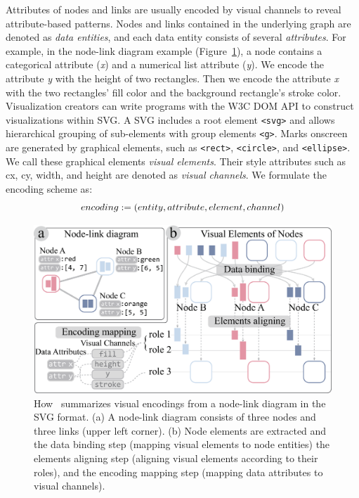 Attributes of nodes and links are usually encoded by visual channels to reveal attribute-based patterns.
Nodes and links contained in the underlying graph are denoted as \textit{data entities}, and each data entity consists of several \textit{attributes}.
For example, in the node-link diagram example (Figure~\ref{fig:VisualEncodings}), a node contains a categorical attribute (\textit{x}) and a numerical list attribute (\textit{y}). We encode the attribute \textit{y} with the height of two rectangles.
Then we encode the attribute \textit{x} with the two rectangles' fill color and the background rectangle's stroke color.
Visualization creators can write programs with the W3C DOM API to construct visualizations within SVG.
A SVG includes a root element \texttt{<svg>} and allows hierarchical grouping of sub-elements with group elements \texttt{<g>}.
Marks onscreen are generated by graphical elements, such as \texttt{<rect>}, \texttt{<circle>}, and \texttt{<ellipse>}.
We call these graphical elements \textit{visual elements}.
Their style attributes such as cx, cy, width, and height are denoted as \textit{visual channels}. We formulate the encoding scheme as:
\begin{equation}
    \abovedisplayskip=5pt
    \abovedisplayshortskip=5pt
    \belowdisplayskip=5pt
    \belowdisplayshortskip=5pt
    encoding := (entity, attribute, element, channel) \label{def:encoding}
\end{equation}


\begin{figure}[tp]
    \centering
    \includegraphics[width=1\columnwidth]{figures/VisualEncodings.eps}
    \setlength{\belowcaptionskip}{-10pt}
    \caption{How \ApproachName~summarizes visual encodings from a node-link diagram in the SVG format. (a) A node-link diagram consists of three nodes and three links (upper left corner). (b) Node elements are extracted and the data binding step (mapping visual elements to node entities)
    the elements aligning step (aligning visual elements according to their roles),
    and the encoding mapping step (mapping data attributes to visual channels).}
    \label{fig:VisualEncodings}
\end{figure}

